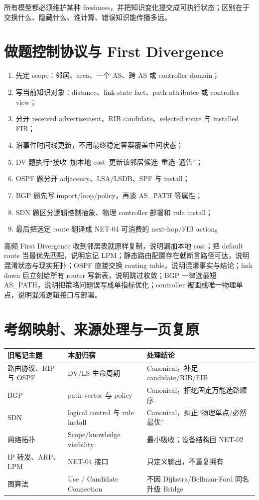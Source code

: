 \documentclass[11pt,a4paper]{ctexart}
\begin{document}
所有模型都必须维护某种 freshness，并把知识变化提交成可执行状态；区别在于交换什么、隐藏什么、谁计算、错误知识能传播多远。

\section{做题控制协议与 First Divergence}

\begin{enumerate}
  \item 先定 scope：邻居、area、一个 AS、跨 AS 或 controller domain；
  \item 写当前知识对象：distance、link-state fact、path attributes 或 controller view；
  \item 分开 received advertisement、RIB candidate、selected route 与 installed FIB；
  \item 沿事件时间线更新，不用最终稳定答案覆盖中间状态；
  \item DV 题执行“接收--加本地 cost--更新该邻居候选--重选--通告”；
  \item OSPF 题分开 adjacency、LSA/LSDB、SPF 与 install；
  \item BGP 题先写 import/loop/policy，再谈 AS\_PATH 等属性；
  \item SDN 题区分逻辑控制抽象、物理 controller 部署和 rule install；
  \item 最后把选定 route 翻译成 NET-04 可消费的 next-hop/FIB action。
\end{enumerate}

\begin{warnbox}{高频 First Divergence}
收到邻居表就原样复制，说明漏加本地 cost；把 default route 当最优先匹配，说明忘记 LPM；静态路由配置存在就断言路径可达，说明混淆状态与现实拓扑；OSPF 直接交换 routing table，说明混淆事实与结论；link down 后立刻给所有 router 写新表，说明跳过收敛；BGP 一律选最短 AS\_PATH，说明把策略问题误写成单指标优化；controller 被画成唯一物理单点，说明混淆逻辑接口与部署。
\end{warnbox}

\section{考纲映射、来源处理与一页复原}

\begin{center}
\small
\begin{tabularx}{\linewidth}{L{3.1cm}Y Y}
\toprule
旧笔记主题 & 本册归宿 & 处理结论\\
\midrule
路由协议、RIP 与 OSPF & DV/LS 生命周期 & Canonical，补足 candidate/RIB/FIB\\
BGP & path-vector 与 policy & Canonical，拒绝固定万能选路顺序\\
SDN & logical control 与 rule install & Canonical，纠正“物理单点/必然最优”\\
网络拓扑 & Scope/knowledge visibility & 最小吸收；设备结构回 NET-02\\
IP 转发、ARP、LPM & NET-04 接口 & 只定义输出，不重复拥有\\
图算法 & Use / Candidate Connection & 不因 Dijkstra/Bellman-Ford 同名升级 Bridge\\
\bottomrule
\end{tabularx}
\end{center}
\end{document}
